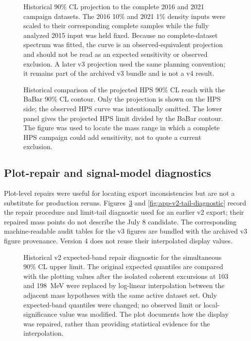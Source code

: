 \begin{figure}[p]
\centering
{}
\caption{Historical 90\% CL projection to the complete 2016 and 2021 campaign
datasets. The 2016 10\% and 2021 1\% density inputs were scaled to their corresponding
complete samples while the fully analyzed 2015 input was held fixed. Because no
complete-dataset spectrum was fitted, the curve is an observed-equivalent projection
and should not be read as an expected sensitivity or observed exclusion. A later v3
projection used the same planning convention; it remains part of the archived v3
bundle and is not a v4 result.}
\label{fig:app-legacy-projections}
\end{figure}

\begin{figure}[p]
\centering
{}
\caption{Historical comparison of the projected HPS 90\% CL reach with the BaBar
90\% CL contour. Only the projection is shown on the HPS side; the observed HPS curve
was intentionally omitted. The lower panel gives the projected HPS limit divided by
the BaBar contour. The figure was used to locate the mass range in which a complete
HPS campaign could add sensitivity, not to quote a current exclusion.}
\label{fig:app-legacy-projection-babar}
\end{figure}

\FloatBarrier

\subsection{Plot-repair and signal-model diagnostics}

Plot-level repairs were useful for locating export inconsistencies but are not a
substitute for production reruns. Figures~\ref{fig:app-v2-repair-diagnostics} and
\ref{fig:app-v2-tail-diagnostic} record the repair procedure and limit-tail diagnostic
used for an earlier v2 export; their repaired mass points do not describe the July 8
candidate. The corresponding machine-readable audit tables for the v3 figures are
bundled with the archived v3 figure provenance. Version 4 does not reuse their
interpolated display values.

\begin{figure}[p]
\centering
{}
\caption{Historical v2 expected-band repair diagnostic for the simultaneous 90\% CL
upper limit. The original expected quantiles are compared with the plotting values
after the isolated coherent excursions at 103 and 198~MeV were replaced by log-linear
interpolation between the adjacent mass hypotheses with the same active dataset set.
Only expected-band quantiles were changed; no observed limit or local-significance
value was modified. The plot documents how the display was repaired, rather than
providing statistical evidence for the interpolation.}
\label{fig:app-v2-repair-diagnostics}
\end{figure}

